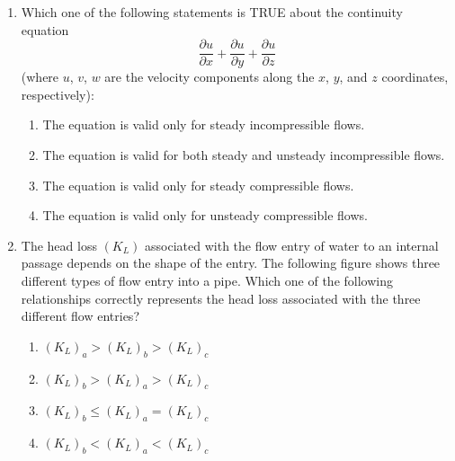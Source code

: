\documentclass[journal,12pt,onecolumn]{IEEEtran}
\theoremstyle{remark}
\begin{document}
\begin{enumerate}
    \item Which one of the following statements is TRUE about the continuity equation $$\frac{\partial u}{\partial x}+\frac{\partial u}{\partial y}+\frac{\partial u}{\partial z}$$
 (where $u$, $v$, $w$ are the velocity components along the $x$, $y$, and $z$ coordinates, respectively):
    \begin{enumerate}
        \item The equation is valid only for steady incompressible flows.
        \item The equation is valid for both steady and unsteady incompressible flows.
        \item The equation is valid only for steady compressible flows.
        \item The equation is valid only for unsteady compressible flows.
    \end{enumerate}

    \item The head loss $(K_L)$ associated with the flow entry of water to an internal passage depends on the shape of the entry. The following figure shows three different types of flow entry into a pipe. Which one of the following relationships correctly represents the head loss associated with the three different flow entries?
    \begin{figure}[H]
        \centering
          
    \end{figure}
    \begin{enumerate}
        \item $(K_L)_a > (K_L)_b > (K_L)_c$
        \item $(K_L)_b > (K_L)_a > (K_L)_c$
        \item $(K_L)_b \leq (K_L)_a = (K_L)_c$
        \item $(K_L)_b < (K_L)_a < (K_L)_c$
    \end{enumerate}


\end{enumerate}
\end{document}
